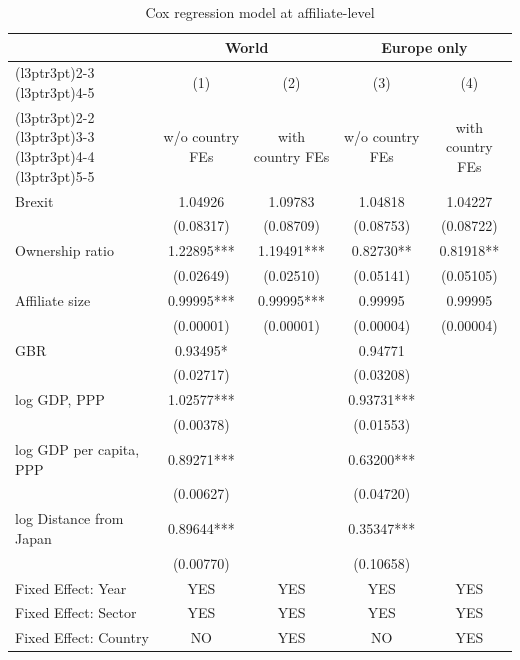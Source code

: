 \begin{table}
\centering
\caption{\label{tab:modelsummary-aff}Cox regression model at affiliate-level}
\centering
\begin{threeparttable}
\begin{tabular}[t]{lcccc}
\toprule
\multicolumn{1}{c}{ } & \multicolumn{2}{c}{World} & \multicolumn{2}{c}{Europe only} \\
\cmidrule(l{3pt}r{3pt}){2-3} \cmidrule(l{3pt}r{3pt}){4-5}
\multicolumn{1}{c}{ } & \multicolumn{1}{c}{(1)} & \multicolumn{1}{c}{(2)} & \multicolumn{1}{c}{(3)} & \multicolumn{1}{c}{(4)} \\
\cmidrule(l{3pt}r{3pt}){2-2} \cmidrule(l{3pt}r{3pt}){3-3} \cmidrule(l{3pt}r{3pt}){4-4} \cmidrule(l{3pt}r{3pt}){5-5}
  & w/o country FEs & with country FEs & w/o country FEs  & with country FEs \\
\midrule
Brexit & \num{1.04926} & \num{1.09783} & \num{1.04818} & \num{1.04227}\\
 & (\num{0.08317}) & (\num{0.08709}) & (\num{0.08753}) & (\num{0.08722})\\
Ownership ratio & \num{1.22895}*** & \num{1.19491}*** & \num{0.82730}** & \num{0.81918}**\\
 & (\num{0.02649}) & (\num{0.02510}) & (\num{0.05141}) & (\num{0.05105})\\
Affiliate size & \num{0.99995}*** & \num{0.99995}*** & \num{0.99995} & \num{0.99995}\\
 & (\num{0.00001}) & (\num{0.00001}) & (\num{0.00004}) & (\num{0.00004})\\
GBR & \num{0.93495}* &  & \num{0.94771} & \\
 & (\num{0.02717}) &  & (\num{0.03208}) & \\
log GDP, PPP & \num{1.02577}*** &  & \num{0.93731}*** & \\
 & (\num{0.00378}) &  & (\num{0.01553}) & \\
log GDP per capita, PPP & \num{0.89271}*** &  & \num{0.63200}*** & \\
 & (\num{0.00627}) &  & (\num{0.04720}) & \\
log Distance from Japan & \num{0.89644}*** &  & \num{0.35347}*** & \\
 & (\num{0.00770}) &  & (\num{0.10658}) & \\
\midrule
Fixed Effect: Year & YES & YES & YES & YES\\
Fixed Effect: Sector & YES & YES & YES & YES\\
Fixed Effect: Country & NO & YES & NO & YES\\

\end{tabular}
\end{threeparttable}
\end{table}
